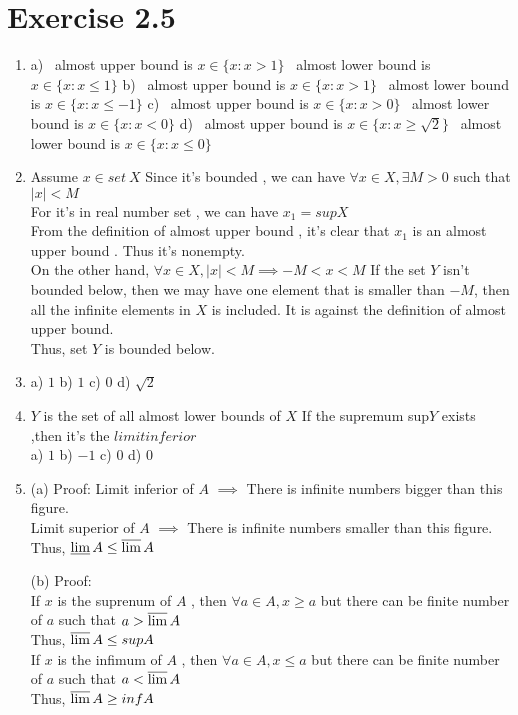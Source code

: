 \documentclass{article}
\begin{document}
\section{Exercise 2.5}
\begin{enumerate}
	\item \subitem a)   \ almost upper bound is  $x\in	\{  x:x>1	\}$
						\ almost lower bound is  $x\in	\{  x:x\leq1	\}$
	\subitem  b)   \ almost upper bound is  $	x \in \{ x:x>1	\}$
			     	\ almost lower bound is  $	x \in \{ x:x\leq-1	\}$
	\subitem  c)   \ almost upper bound is  $x	\in \{ x:x>0	\}$
					\ almost lower bound is  $x	\in \{ x:x<0	\}$ 
	\subitem  d)   \ almost upper bound is  $x	\in \{  x:x\geq \sqrt{2}\}$
				\ almost lower bound is  $	x	\in \{  x:x\leq0	\}$ 
	\item  Assume $x \in set \  X$ Since it's bounded , we can have $\forall x \in X , \exists M>0 $ such that $\lvert x \rvert < M$ \\
	For it's in real number set , we can have $x_1=supX $ \\
	From the definition of almost upper bound , it's clear that $x_1$ is an almost upper bound . Thus it's nonempty.\\
	On the other hand, $\forall x \in X , \lvert x \rvert < M \implies -M<x<M$ If the set $Y$ isn't bounded below, then we may have one element that is smaller than $-M$, then all the infinite elements in $X$ is included. It is against the definition of almost upper bound.\\
	Thus, set $Y$ is bounded below.
	
	\item \subitem a) $1$ \subitem b) $1$ \subitem c) $0$ \subitem d) $\sqrt{2} $
	
	
	\item $Y$ is the set of all almost lower bounds of $X$ If the supremum sup$Y$ exists ,then it's the $limit inferior$ \\

	\subitem a) $1$ \subitem b) $-1$ \subitem c) $0$ \subitem d) $0$
	
	\item
	\subitem (a) Proof: Limit inferior of $A$ $\implies$ There is infinite numbers bigger than this figure. \\ Limit superior of $A$ $\implies$ There is infinite numbers smaller than this figure.\\
	Thus, $\varliminf A \leq \varlimsup A$
	
	\subitem (b) Proof:\\ If $x$ is the suprenum of $A$ , then $\forall a \in A , x \geq a$ but there can be finite number of $a$ such that $a > \varlimsup A$\\
	Thus, $\varlimsup A \leq sup A$\\
	If $x$ is the infimum of $A$ , then $\forall a \in A , x \leq a$ but there can be finite number of $a$ such that $a < \varlimsup A$\\
	Thus, $\varlimsup A \geq inf A$
	


\end{enumerate}
\end{document}
